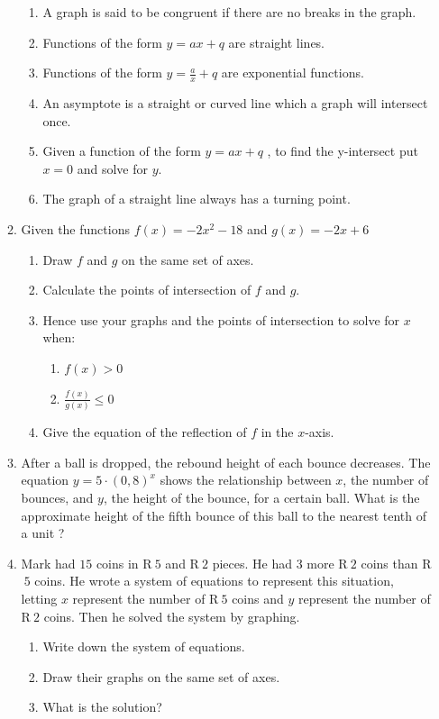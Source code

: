 \begin{enumerate}[noitemsep, label=\textbf{\arabic*}. ]
\begin{enumerate}[noitemsep, label=\textbf{\arabic*}. ]
\begin{enumerate}[noitemsep, label=\textbf{\alph*}. ]
    \item A graph is said to be congruent if there are no breaks in the graph.
    \item Functions of the form $y=ax+q$ are straight lines.
    \item Functions of the form $y=\frac{a}{x}+q$ are exponential functions.
    \item  An asymptote is a straight or curved line which a graph will intersect once.
    \item Given a function of the form $y=ax+q$ , to find the y-intersect put $x=0$ and solve for $y$.
    \item The graph of a straight line always has a turning point.
    \end{enumerate}
\item Given the functions $f(x)=-2{x}^{2}-18$ and $g(x)=-2x+6$
    \begin{enumerate}[noitemsep, label=\textbf{\alph*}. ] 
    \item Draw $f$ and $g$ on the same set of axes.
    \item Calculate the points of intersection of $f$ and $g$.
    \item Hence use your graphs and the points of intersection to solve for $x$ when:
	\begin{enumerate}[noitemsep, label=\textbf{\roman*}. ] 
	\item $f(x)>0$
	\item $\frac{f(x)}{g(x)}\le 0$
	\end{enumerate}
    \item Give the equation of the reflection of $f$ in the $x$-axis.
    \end{enumerate}
\item After a ball is dropped, the rebound height of each bounce decreases. The equation $y=5\ensuremath{\cdot}{(0,8)}^{x}$ shows the relationship between $x$, the number of bounces, and $y$, the height of the bounce, for a certain ball. What is the approximate height of the fifth bounce of this ball to the nearest tenth of a unit ?\newline
\item Mark had $15$ coins in R$~5$ and R$~2$ pieces. He had $3$ more R$~2$ coins than R$~5$ coins. He wrote a system of equations to represent this situation, letting $x$ represent the number of R$~5$ coins and $y$ represent the number of R$~2$ coins. Then he solved the system by graphing.
    \begin{enumerate}[noitemsep, label=\textbf{\alph*}. ] 
    \item Write down the system of equations.
    \item Draw their graphs on the same set of axes.
    \item What is the solution?
    \end{enumerate}


\end{enumerate}
\end{enumerate}
